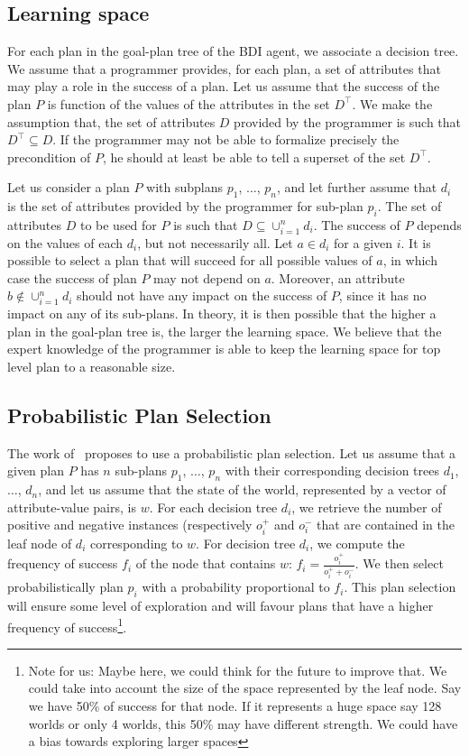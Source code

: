 \documentclass{article}
\begin{document}
\subsection{Learning space}

For each plan in the goal-plan tree of the BDI agent, we associate a
decision tree. We assume that a programmer provides, for each plan, a
set of attributes that may play a role in the success of a plan. Let
us assume that the success of the plan $P$ is function of the values
of the attributes in the set $D^{\top}$. We make the assumption that,
the set of attributes $D$ provided by the programmer is such that
$D^{\top} \subseteq D$. If the programmer may not be able to formalize
precisely the precondition of $P$, he should at least be able to tell
a superset of the set $D^{\top}$.

Let us consider a plan $P$ with subplans $p_1$, $\dots$, $p_n$, and
let further assume that $d_i$ is the set of attributes provided by the
programmer for sub-plan $p_i$. The set of attributes $D$ to be used
for $P$ is such that $D \subseteq \cup_{i=1}^n d_i$. The success of
$P$ depends on the values of each $d_i$, but not necessarily all. Let
$a \in d_i$ for a given $i$. It is possible to select a plan that will
succeed for all possible values of $a$, in which case the success of
plan $P$ may not depend on $a$. Moreover, an attribute $b \notin
\cup_{i=1}^n d_i$ should not have any impact on the success of $P$,
since it has no impact on any of its sub-plans. In theory, it is then
possible that the higher a plan in the goal-plan tree is, the larger
the learning space. We believe that the expert knowledge of the
programmer is able to keep the learning space for top level plan to a
reasonable size.

\subsection{Probabilistic Plan Selection}

The work of~\cite{Singh10:Learning} proposes to use a probabilistic
plan selection. Let us assume that a given plan $P$ has $n$ sub-plans
$p_1$, $\dots$, $p_n$ with their corresponding decision trees $d_1$,
$\dots$, $d_n$, and let us assume that the state of the world,
represented by a vector of attribute-value pairs, is $w$. For each
decision tree $d_i$, we retrieve the number of positive and negative
instances (respectively $o^+_i$ and $o^-_i$ that are contained in the
leaf node of $d_i$ corresponding to $w$. For decision tree $d_i$, we
compute the frequency of success $f_i$ of the node that contains $w$:
$f_i=\frac{o^+_i}{o^+_i + o^-_i}$.  We then select probabilistically
plan $p_i$ with a probability proportional to $f_i$. This plan
selection will ensure some level of exploration and will favour plans
that have a higher frequency of success\footnote{Note for us: Maybe
  here, we could think for the future to improve that. We could take
  into account the size of the space represented by the leaf node. Say
  we have 50\% of success for that node. If it represents a huge space
  say 128 worlds or only 4 worlds, this 50\% may have different
  strength. We could have a bias towards exploring larger spaces}.
\end{document}
